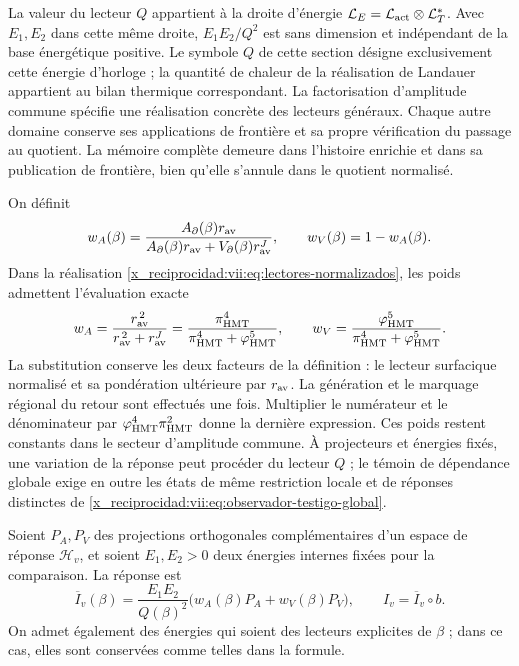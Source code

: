 La valeur du lecteur \(Q\) appartient à la droite d'énergie \(\mathcal L_E=\mathcal L_{\rm act}\otimes\mathcal L_T^*\). Avec \(E_1,E_2\) dans cette même droite, \(E_1E_2/Q^2\) est sans dimension et indépendant de la base énergétique positive. Le symbole \(Q\) de cette section désigne exclusivement cette énergie d'horloge ; la quantité de chaleur de la réalisation de Landauer appartient au bilan thermique correspondant. La factorisation d'amplitude commune spécifie une réalisation concrète des lecteurs généraux. Chaque autre domaine conserve ses applications de frontière et sa propre vérification du passage au quotient. La mémoire complète demeure dans l'histoire enrichie et dans sa publication de frontière, bien qu'elle s'annule dans le quotient normalisé.


On définit
\[
 w_A(\beta)=
 \frac{A_\partial(\beta)r_{\rm av}}
 {A_\partial(\beta)r_{\rm av}+V_\partial(\beta)r_{\rm av}^{J}},
 \qquad w_V(\beta)=1-w_A(\beta).
\]
Dans la réalisation \eqref{x_reciprocidad:vii:eq:lectores-normalizados}, les poids
admettent l'évaluation exacte
\begin{equation}
 w_A=\frac{r_{\rm av}^{\,2}}{r_{\rm av}^{\,2}+r_{\rm av}^{J}}
     =\frac{\pi_{\rm HMT}^{4}}
            {\pi_{\rm HMT}^{4}+\varphi_{\rm HMT}^{5}},\qquad
 w_V=\frac{\varphi_{\rm HMT}^{5}}
            {\pi_{\rm HMT}^{4}+\varphi_{\rm HMT}^{5}}.
 \label{x_reciprocidad:vii:eq:pesos-amplitud-comun}
\end{equation}
La substitution conserve les deux facteurs de la définition : le lecteur
surfacique normalisé et sa pondération ultérieure par \(r_{\rm av}\).
La génération et le marquage régional du retour sont effectués une fois.
Multiplier le numérateur
et le dénominateur par \(\varphi_{\rm HMT}^4\pi_{\rm HMT}^2\)
donne la dernière expression. Ces poids restent constants dans le
secteur d'amplitude commune. À projecteurs et énergies fixés, une
variation de la réponse peut procéder du lecteur \(Q\) ;
le témoin de dépendance globale exige en outre les états de
même restriction locale et de réponses distinctes de
\eqref{x_reciprocidad:vii:eq:observador-testigo-global}.


Soient \(P_A,P_V\) des projections orthogonales complémentaires d'un
espace de réponse \(\mathcal H_v\), et soient \(E_1,E_2>0\)
deux énergies internes fixées pour la comparaison. La réponse est
\begin{equation}
 \overline I_v(\beta)=\frac{E_1E_2}{Q(\beta)^2}
       \bigl(w_A(\beta)P_A+w_V(\beta)P_V\bigr),
 \qquad I_v=\overline I_v\circ b.
 \label{x_reciprocidad:vii:eq:observador-respuesta-ponderada}
\end{equation}
On admet également des énergies qui soient des lecteurs explicites de
\(\beta\) ; dans ce cas, elles sont conservées comme telles dans la formule.

